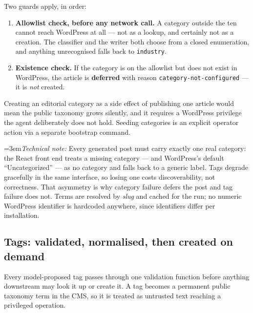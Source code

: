 \documentclass[11pt,a4paper]{article}
\newcommand{\brk}{\hyphenpenalty=0\exhyphenpenalty=0\relax}
\newcommand{\code}[1]{\texttt{\small\brk #1}}
\newcommand{\technote}[1]{\par\vspace{-0.25em}\begingroup\footnotesize\color{aitkGray}\sloppy\emergencystretch=3em\textit{Technical note:} #1\par\endgroup}
\begin{document}
\begin{blockbox}
Two guards apply, in order:
\begin{enumerate}[leftmargin=1.4em,itemsep=0.2em,topsep=0.3em]
  \item \textbf{Allowlist check, before any network call.} A category outside the
    ten cannot reach WordPress at all --- not as a lookup, and certainly not as a
    creation. The classifier and the writer both choose from a closed enumeration,
    and anything unrecognised falls back to \code{industry}.
  \item \textbf{Existence check.} If the category is on the allowlist but does not
    exist in WordPress, the article is \textbf{deferred} with reason
    \code{category-not-configured} --- it is \emph{not} created.
\end{enumerate}
Creating an editorial category as a side effect of publishing one article would
mean the public taxonomy grows silently, and it requires a WordPress privilege the
agent deliberately does not hold. Seeding categories is an explicit operator
action via a separate bootstrap command.
\end{blockbox}

\technote{Every generated post must carry exactly one real category: the React
front end treats a missing category --- and WordPress's default ``Uncategorized''
--- as no category and falls back to a generic label. Tags degrade gracefully in the
same interface, so losing one costs discoverability, not correctness. That
asymmetry is why category failure defers the post and tag failure does not.
Terms are resolved by \emph{slug} and cached for the run; no numeric WordPress
identifier is hardcoded anywhere, since identifiers differ per installation.}

\subsection{Tags: validated, normalised, then created on demand}

Every model-proposed tag passes through one validation function before anything
downstream may look it up or create it. A tag becomes a permanent public taxonomy
term in the CMS, so it is treated as untrusted text reaching a privileged
operation.
\end{document}
